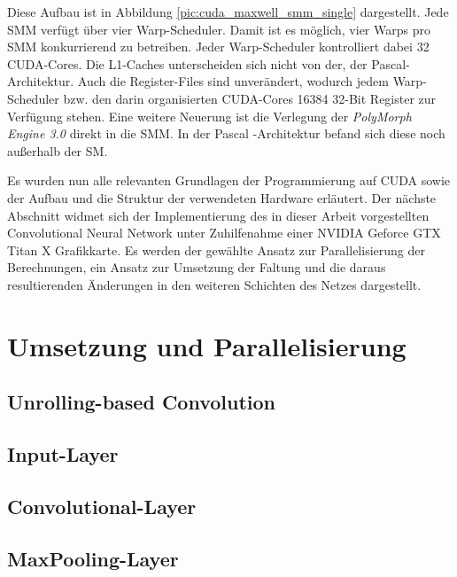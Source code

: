 \documentclass[../main.tex]{subfiles}
\begin{document}
Diese Aufbau ist in Abbildung \ref{pic:cuda_maxwell_smm_single} dargestellt. Jede SMM verfügt über vier Warp-Scheduler. Damit ist es möglich, vier Warps pro SMM konkurrierend zu betreiben. Jeder Warp-Scheduler kontrolliert dabei 32 CUDA-Cores. Die L1-Caches unterscheiden sich nicht von der, der Pascal-Architektur. Auch die Register-Files sind unverändert, wodurch jedem Warp-Scheduler bzw. den darin organisierten CUDA-Cores 16384 32-Bit Register zur Verfügung stehen. Eine weitere Neuerung ist die Verlegung der \emph{PolyMorph Engine 3.0} direkt in die SMM. In der Pascal -Architektur befand sich diese noch außerhalb der SM. \par 
Es wurden nun alle relevanten Grundlagen der Programmierung auf CUDA sowie der Aufbau und die Struktur der verwendeten Hardware erläutert. Der nächste Abschnitt widmet sich der Implementierung des in dieser Arbeit vorgestellten Convolutional Neural Network unter Zuhilfenahme einer NVIDIA Geforce GTX Titan X Grafikkarte. Es werden der gewählte Ansatz zur Parallelisierung der Berechnungen, ein Ansatz zur Umsetzung der Faltung und die daraus resultierenden Änderungen in den weiteren Schichten des Netzes dargestellt. \par 
\section{Umsetzung und Parallelisierung} \label{sec:cuda_umsetzung} 


\subsection{Unrolling-based Convolution} \label{sec:cuda_unrolling_conv}
\subsection{Input-Layer} \label{sec:cuda_input}
\subsection{Convolutional-Layer} \label{sec:cuda_conv}
\subsection{MaxPooling-Layer} \label{sec:cuda_pooling}
\end{document}
